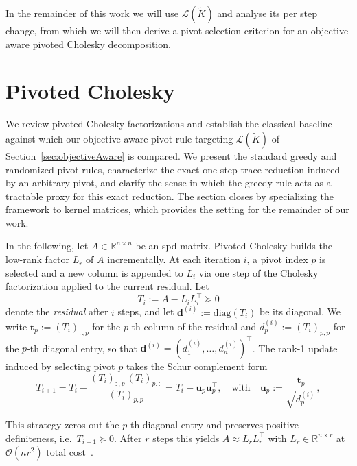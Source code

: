 \documentclass[onefignum,onetabnum]{siamart250211}
\newcommand{\R}{\mathbb{R}}
\begin{document}
In the remainder of this work we will use $\mathcal{L}(\widetilde{K})$ and analyse its per step change, from which we will then derive a pivot selection criterion for an objective-aware pivoted Cholesky decomposition.

\section{Pivoted Cholesky} \label{sec:pcholesky}

We review pivoted Cholesky factorizations and establish the classical baseline against which our objective-aware pivot rule targeting $\mathcal{L}(\widetilde{K})$ of Section~\ref{sec:objectiveAware} is  compared. We present the standard greedy and randomized pivot rules, characterize the exact one-step trace reduction induced by an arbitrary pivot, and clarify the sense in which the greedy rule acts as a tractable proxy for this exact reduction. The section closes by specializing the framework to kernel matrices, which provides the setting for the remainder of our work.

In the following, let $A\in\R^{n\times n}$ be an spd matrix. Pivoted Cholesky \cite{higham.1990, higham.2009, harbrecht.2012} builds the low-rank factor $L_r$ of $A$ incrementally. At each iteration $i$, a pivot index $p$ is selected and a new column is appended to $L_i$ via one step of the Cholesky factorization applied to the current residual. Let
\begin{equation}
\label{eq:residual}
    T_i := A - L_i L_i^\top \succeq 0
\end{equation}
denote the \textit{residual} after $i$ steps, and let $\bm{d}^{(i)} := \mathrm{diag}(T_i)$ be its diagonal.
We write $\bm{t}_p := (T_i)_{:,p}$ for the $p$-th column of the residual and $d_p^{(i)} := (T_i)_{p,p}$ for the $p$-th diagonal entry, so that $\bm{d}^{(i)} = (d_1^{(i)}, \ldots, d_n^{(i)})^\top$. 
The rank-1 update induced by selecting pivot $p$ takes the Schur complement form
\begin{equation}
    T_{i+1} = T_i - \frac{(T_i)_{:,p}\,(T_i)_{p,:}}{(T_i)_{p,p}}
    = T_i - \bm{u}_p \bm{u}_p^\top,
    \quad\text{with}\quad
    \bm{u}_p := \frac{\bm{t}_p}{\sqrt{d_p^{(i)}}},
\label{eq:schur}
\end{equation}

This strategy zeros out the $p$-th diagonal entry and preserves positive definiteness, i.e.\ $T_{i+1} \succeq 0$. After $r$ steps this yields $A \approx L_r L_r^\top$ with $L_r \in \mathbb{R}^{n \times r}$ at $\mathcal{O}(n r^2)$ total cost~\cite{harbrecht.2012}.
\end{document}
